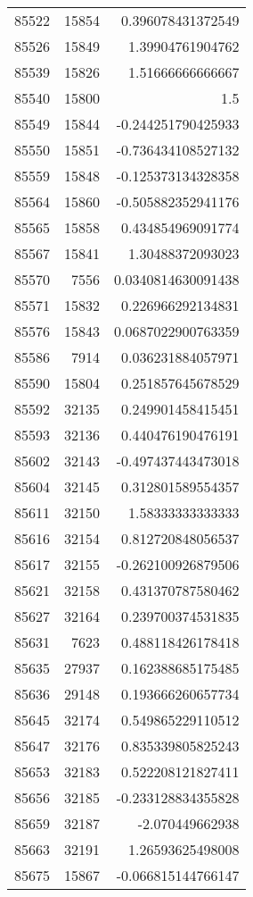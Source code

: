 \begin{tabular}{r | r | r}
85522 & 15854 & 0.396078431372549 \\
85526 & 15849 & 1.39904761904762 \\
85539 & 15826 & 1.51666666666667 \\
85540 & 15800 & 1.5 \\
85549 & 15844 & -0.244251790425933 \\
85550 & 15851 & -0.736434108527132 \\
85559 & 15848 & -0.125373134328358 \\
85564 & 15860 & -0.505882352941176 \\
85565 & 15858 & 0.434854969091774 \\
85567 & 15841 & 1.30488372093023 \\
85570 & 7556 & 0.0340814630091438 \\
85571 & 15832 & 0.226966292134831 \\
85576 & 15843 & 0.0687022900763359 \\
85586 & 7914 & 0.036231884057971 \\
85590 & 15804 & 0.251857645678529 \\
85592 & 32135 & 0.249901458415451 \\
85593 & 32136 & 0.440476190476191 \\
85602 & 32143 & -0.497437443473018 \\
85604 & 32145 & 0.312801589554357 \\
85611 & 32150 & 1.58333333333333 \\
85616 & 32154 & 0.812720848056537 \\
85617 & 32155 & -0.262100926879506 \\
85621 & 32158 & 0.431370787580462 \\
85627 & 32164 & 0.239700374531835 \\
85631 & 7623 & 0.488118426178418 \\
85635 & 27937 & 0.162388685175485 \\
85636 & 29148 & 0.193666260657734 \\
85645 & 32174 & 0.549865229110512 \\
85647 & 32176 & 0.835339805825243 \\
85653 & 32183 & 0.522208121827411 \\
85656 & 32185 & -0.233128834355828 \\
85659 & 32187 & -2.070449662938 \\
85663 & 32191 & 1.26593625498008 \\
85675 & 15867 & -0.066815144766147 \\

\end{tabular}
